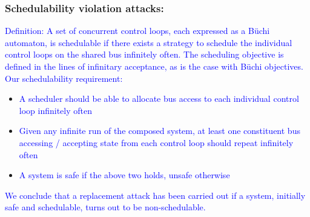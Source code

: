 \begin{frame}
\frametitle{Schedulability violation attacks:}



\tiny{\textcolor{blue}{Definition: A set of concurrent control loops, each expressed as a B\"{u}chi automaton, 
is schedulable if there exists a strategy to schedule the individual control
loops on the shared bus infinitely often. The scheduling objective is defined in the
lines of infinitary acceptance, as is the case with B\"{u}chi objectives.}}\\


\tiny{\textcolor{blue}{Our schedulability requirement:}}
\begin{itemize}

\item \tiny{\textcolor{blue}{A scheduler should be able to allocate bus access to each individual control loop infinitely often }}

\item \tiny{\textcolor{blue}{Given any infinite run of the
composed system, at least one constituent bus accessing / accepting state from
each control loop should repeat infinitely often}}

\item \tiny{\textcolor{blue}{A system is safe if the above two
holds, unsafe otherwise}}
\end{itemize}

\tiny{\textcolor{blue}{We conclude that a replacement attack has been carried
out if a system, initially safe and schedulable, turns out to be non-schedulable.}}


\end{frame}
